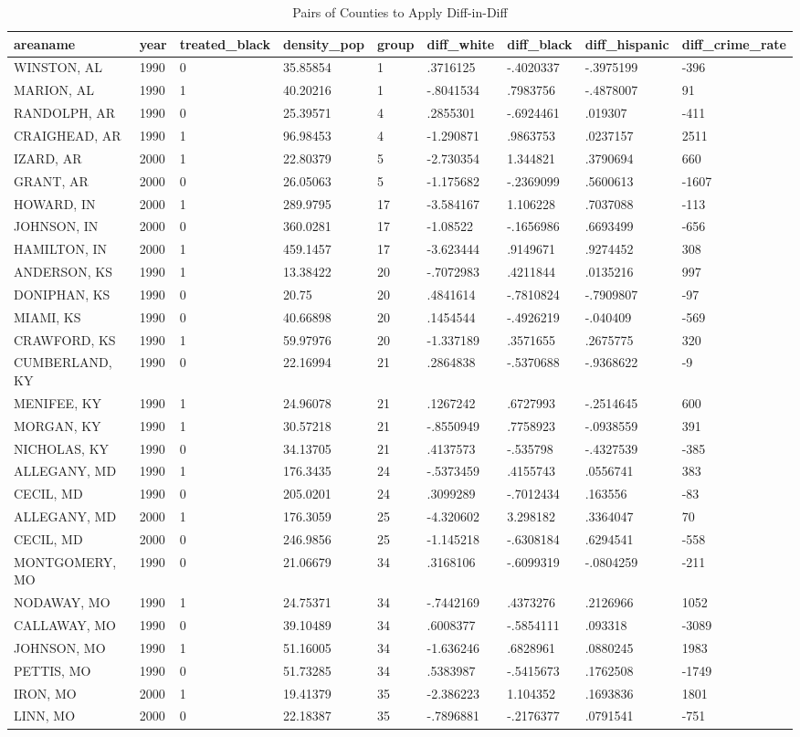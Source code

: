 \documentclass{article}
\begin{document}
\begin{table}[tbp] \centering%
\caption{Pairs of Counties to Apply Diff-in-Diff}%
\begin{tabularx}{\textwidth}{lCCCCCCCC}
\toprule
areaname&year&treated\_black&density\_pop&group&diff\_white&diff\_black&diff\_hispanic&diff\_crime\_rate \tabularnewline
\midrule\addlinespace[1.5ex]
WINSTON, AL&1990&0&35.85854&1&.3716125&-.4020337&-.3975199&-396 \tabularnewline
MARION, AL&1990&1&40.20216&1&-.8041534&.7983756&-.4878007&91 \tabularnewline
RANDOLPH, AR&1990&0&25.39571&4&.2855301&-.6924461&.019307&-411 \tabularnewline
CRAIGHEAD, AR&1990&1&96.98453&4&-1.290871&.9863753&.0237157&2511 \tabularnewline
IZARD, AR&2000&1&22.80379&5&-2.730354&1.344821&.3790694&660 \tabularnewline
GRANT, AR&2000&0&26.05063&5&-1.175682&-.2369099&.5600613&-1607 \tabularnewline
HOWARD, IN&2000&1&289.9795&17&-3.584167&1.106228&.7037088&-113 \tabularnewline
JOHNSON, IN&2000&0&360.0281&17&-1.08522&-.1656986&.6693499&-656 \tabularnewline
HAMILTON, IN&2000&1&459.1457&17&-3.623444&.9149671&.9274452&308 \tabularnewline
ANDERSON, KS&1990&1&13.38422&20&-.7072983&.4211844&.0135216&997 \tabularnewline
DONIPHAN, KS&1990&0&20.75&20&.4841614&-.7810824&-.7909807&-97 \tabularnewline
MIAMI, KS&1990&0&40.66898&20&.1454544&-.4926219&-.040409&-569 \tabularnewline
CRAWFORD, KS&1990&1&59.97976&20&-1.337189&.3571655&.2675775&320 \tabularnewline
CUMBERLAND, KY&1990&0&22.16994&21&.2864838&-.5370688&-.9368622&-9 \tabularnewline
MENIFEE, KY&1990&1&24.96078&21&.1267242&.6727993&-.2514645&600 \tabularnewline
MORGAN, KY&1990&1&30.57218&21&-.8550949&.7758923&-.0938559&391 \tabularnewline
NICHOLAS, KY&1990&0&34.13705&21&.4137573&-.535798&-.4327539&-385 \tabularnewline
ALLEGANY, MD&1990&1&176.3435&24&-.5373459&.4155743&.0556741&383 \tabularnewline
CECIL, MD&1990&0&205.0201&24&.3099289&-.7012434&.163556&-83 \tabularnewline
ALLEGANY, MD&2000&1&176.3059&25&-4.320602&3.298182&.3364047&70 \tabularnewline
CECIL, MD&2000&0&246.9856&25&-1.145218&-.6308184&.6294541&-558 \tabularnewline
MONTGOMERY, MO&1990&0&21.06679&34&.3168106&-.6099319&-.0804259&-211 \tabularnewline
NODAWAY, MO&1990&1&24.75371&34&-.7442169&.4373276&.2126966&1052 \tabularnewline
CALLAWAY, MO&1990&0&39.10489&34&.6008377&-.5854111&.093318&-3089 \tabularnewline
JOHNSON, MO&1990&1&51.16005&34&-1.636246&.6828961&.0880245&1983 \tabularnewline
PETTIS, MO&1990&0&51.73285&34&.5383987&-.5415673&.1762508&-1749 \tabularnewline
IRON, MO&2000&1&19.41379&35&-2.386223&1.104352&.1693836&1801 \tabularnewline
LINN, MO&2000&0&22.18387&35&-.7896881&-.2176377&.0791541&-751 \tabularnewline

\end{tabularx}
\end{table}
\end{document}
